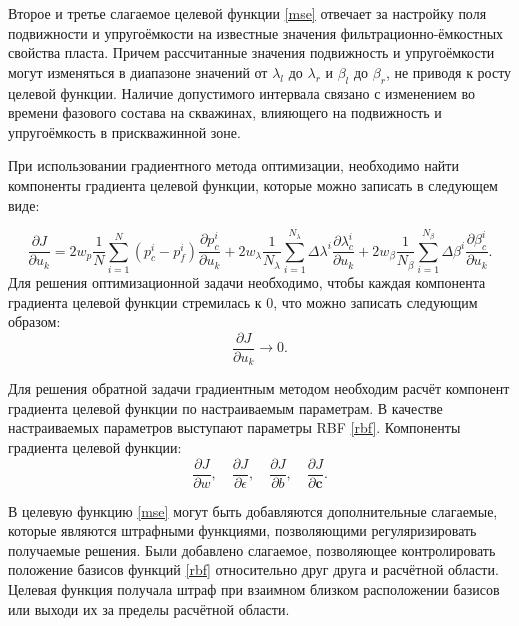\documentclass{article}
\begin{document}
Второе и третье слагаемое целевой функции {\ref{mse}} отвечает за настройку поля подвижности и упругоёмкости на известные значения фильтрационно-ёмкостных свойства пласта. Причем рассчитанные значения подвижность и упругоёмкости могут изменяться в диапазоне значений от $\lambda_l$ до $\lambda_r$ и $\beta_l$ до $\beta_r$, не приводя к росту целевой функции. Наличие допустимого интервала связано с изменением во времени фазового состава на скважинах, влияющего на подвижность и упругоёмкость в прискважинной зоне. 

При использовании градиентного метода оптимизации, необходимо найти компоненты градиента
целевой функции, которые можно записать в следующем виде:

\begin{equation}\label{grad}
	\frac{\partial J}{\partial u_k} = 
	2w_p\frac{1}{N}\sum_{i=1}^N	({p_c^i-p_f^i}) \frac{\partial p_c^i}{\partial u_k}+
	2w_{\lambda}\frac{1}{N_\lambda}\sum_{i=1}^{N_\lambda}{\Delta\lambda^i}\frac{\partial
		\lambda_{c}^i}{\partial u_k}+
	2w_{\beta}\frac{1}{N_\beta}\sum_{i=1}^{N_\beta}{\Delta\beta^i}\frac{\partial
			\beta_{c}^i}{\partial u_k}.
\end{equation}
Для решения оптимизационной задачи необходимо, чтобы каждая компонента градиента целевой функции стремилась к 0, что можно записать следующим образом:
\begin{equation} \label{rp}
	\frac{\partial J}{\partial u_k} \rightarrow 0.
\end{equation}

Для решения обратной задачи градиентным методом необходим расчёт компонент градиента целевой функции по настраиваемым параметрам. В качестве настраиваемых параметров выступают параметры RBF \ref{rbf}. Компоненты градиента целевой функции:
\begin{equation*}
		\frac{\partial J}{\partial w},\quad \frac{\partial J}{\partial \epsilon},\quad \frac{\partial J}{\partial b}, \quad \frac{\partial J}{\partial \mathbf{c}}.
\end{equation*}

В целевую функцию \ref{mse} могут быть добавляются дополнительные слагаемые, которые являются штрафными функциями, позволяющими регуляризировать получаемые решения. Были добавлено слагаемое, позволяющее контролировать положение базисов функций \ref{rbf} относительно друг друга и расчётной области. Целевая функция получала штраф при взаимном близком расположении базисов или выходи их за пределы расчётной области.
\end{document}
